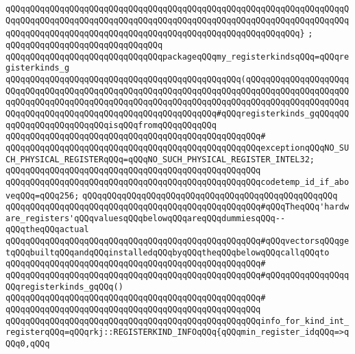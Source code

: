\verb|qQQqqQQqqQQqqQQqqQQqqQQqqQQqqQQqqQQqqQQqqQQqqQQqqQQqqQQqqQQqqQQqqQQqqQQqqQQqqQQqqQQqqQQqqQQqqQQqqQQqqQQqqQQqqQQqqQQqqQQqqQQqqQQqqQQqqQQqqQQqqQQqqQQqqQQqqQQqqQQqqQQqqQQqqQQqqQQqqQQqqQQqqQQqqQQqqQQqqQQq}|\newline
\verb|;|\newline
\verb|qQQqqQQqqQQqqQQqqQQqqQQqqQQqqQQq|\newline
\verb|qQQqqQQqqQQqqQQqqQQqqQQqqQQqqQQqpackageqQQqmy_registerkindsqQQq=qQQqregisterkinds_g|\newline
\verb|qQQqqQQqqQQqqQQqqQQqqQQqqQQqqQQqqQQqqQQqqQQqqQQq(qQQqqQQqqQQqqQQqqQQqqQQqqQQqqQQqqQQqqQQqqQQqqQQqqQQqqQQqqQQqqQQqqQQqqQQqqQQqqQQqqQQqqQQqqQQqqQQqqQQqqQQqqQQqqQQqqQQqqQQqqQQqqQQqqQQqqQQqqQQqqQQqqQQqqQQqqQQqqQQqqQQqqQQqqQQqqQQqqQQqqQQqqQQqqQQqqQQqqQQqqQQq#qQQqregisterkinds_gqQQqqQQqqQQqqQQqqQQqqQQqqQQqisqQQqfromqQQqqQQqqQQq|\newline
\verb|qQQqqQQqqQQqqQQqqQQqqQQqqQQqqQQqqQQqqQQqqQQqqQQqqQQq#|\newline
\verb|qQQqqQQqqQQqqQQqqQQqqQQqqQQqqQQqqQQqqQQqqQQqqQQqqQQqexceptionqQQqNO_SUCH_PHYSICAL_REGISTERqQQq=qQQqNO_SUCH_PHYSICAL_REGISTER_INTEL32;|\newline
\verb|qQQqqQQqqQQqqQQqqQQqqQQqqQQqqQQqqQQqqQQqqQQqqQQqqQQq|\newline
\verb|qQQqqQQqqQQqqQQqqQQqqQQqqQQqqQQqqQQqqQQqqQQqqQQqqQQqcodetemp_id_if_aboveqQQq=qQQq256;|\newline
\verb|qQQqqQQqqQQqqQQqqQQqqQQqqQQqqQQqqQQqqQQqqQQqqQQqqQQq|\newline
\verb|qQQqqQQqqQQqqQQqqQQqqQQqqQQqqQQqqQQqqQQqqQQqqQQqqQQq#qQQqTheqQQq'hardware_registers'qQQqvaluesqQQqbelowqQQqareqQQqdummiesqQQq--qQQqtheqQQqactual|\newline
\verb|qQQqqQQqqQQqqQQqqQQqqQQqqQQqqQQqqQQqqQQqqQQqqQQqqQQq#qQQqvectorsqQQqgetqQQqbuiltqQQqandqQQqinstalledqQQqbyqQQqtheqQQqbelowqQQqcallqQQqto|\newline
\verb|qQQqqQQqqQQqqQQqqQQqqQQqqQQqqQQqqQQqqQQqqQQqqQQqqQQq#|\newline
\verb|qQQqqQQqqQQqqQQqqQQqqQQqqQQqqQQqqQQqqQQqqQQqqQQqqQQq#qQQqqQQqqQQqqQQqqQQqregisterkinds_gqQQq()|\newline
\verb|qQQqqQQqqQQqqQQqqQQqqQQqqQQqqQQqqQQqqQQqqQQqqQQqqQQq#|\newline
\verb|qQQqqQQqqQQqqQQqqQQqqQQqqQQqqQQqqQQqqQQqqQQqqQQqqQQq|\newline
\verb|qQQqqQQqqQQqqQQqqQQqqQQqqQQqqQQqqQQqqQQqqQQqqQQqqQQqinfo_for_kind_int_registerqQQq=qQQqrkj::REGISTERKIND_INFOqQQq{qQQqmin_register_idqQQq=>qQQq0,qQQq|\newline
